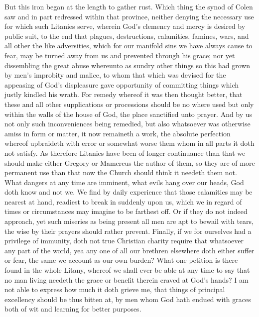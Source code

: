 But this iron began at the length to gather rust. Which thing the synod of Colen saw and in part redressed within that province, neither denying the necessary use for which such Litanies serve, wherein God’s clemency and mercy is desired by public suit, to the end that plagues, destructions, calamities, famines, wars, and all other the like adversities, which for our manifold sins we have always cause to fear, may  be turned away from us and prevented through his grace; nor yet dissembling the great abuse whereunto as sundry other things so this had grown by men’s improbity and malice, to whom that which was devised for the appeasing of God’s displeasure gave opportunity of committing things which justly kindled his wrath. For remedy whereof it was then thought better, that these and all other supplications or processions should be no where used but only within the walls of the house of God, the place sanctified unto prayer. And by us not only such inconveniences being remedied, but also whatsoever was otherwise amiss in form or matter, it now remaineth a work, the absolute perfection whereof upbraideth with error or somewhat worse them whom in all parts it doth not satisfy.
As therefore Litanies have been of longer continuance than that we should make either Gregory or Mamercus the author of them, so they are of more permanent use than that now the Church should think it needeth them not. What dangers at any time are imminent, what evils hang over our heads, God doth know and not we. We find by daily experience that those calamities may be nearest at hand, readiest to break in suddenly upon us, which we in regard of times or circumstances may imagine to be farthest off. Or if they do not indeed approach, yet such miseries as being present all men are apt to bewail with tears, the wise by their prayers should rather prevent. Finally, if we for ourselves had a privilege of immunity, doth not true Christian charity require that whatsoever any part of the world, yea any one of all our brethren elsewhere doth either suffer or fear, the same we account as our own burden? What one petition is there found in the whole Litany, whereof we shall ever be able at any time to say that no man living needeth the grace or benefit therein craved at God’s hands? I am not able to express how much it doth grieve me, that things of principal excellency should be thus bitten at, by men whom God hath endued with graces both of wit and learning for better purposes.

